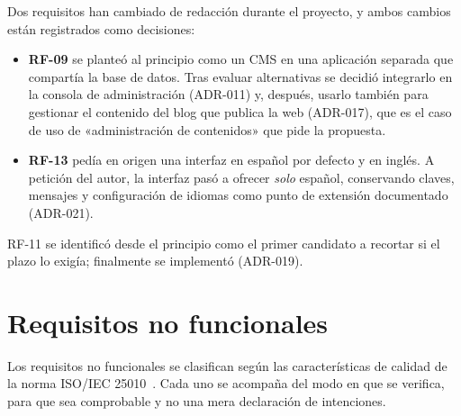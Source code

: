 Dos requisitos han cambiado de redacción durante el proyecto, y ambos cambios
están registrados como decisiones:

\begin{itemize}
  \item \textbf{RF-09} se planteó al principio como un CMS en una aplicación
        separada que compartía la base de datos. Tras evaluar alternativas se
        decidió integrarlo en la consola de administración (ADR-011) y,
        después, usarlo también para gestionar el contenido del blog que
        publica la web (ADR-017), que es el caso de uso de «administración de
        contenidos» que pide la propuesta.
  \item \textbf{RF-13} pedía en origen una interfaz en español por defecto y
        en inglés. A petición del autor, la interfaz pasó a ofrecer
        \emph{solo} español, conservando claves, mensajes y configuración de
        idiomas como punto de extensión documentado (ADR-021).
\end{itemize}

RF-11 se identificó desde el principio como el primer candidato a recortar si
el plazo lo exigía; finalmente se implementó (ADR-019).

\section{Requisitos no funcionales}
\label{sec:req-rnf}

Los requisitos no funcionales se clasifican según las características de
calidad de la norma ISO/IEC 25010~\cite{iso25010}. Cada uno se acompaña del
modo en que se verifica, para que sea comprobable y no una mera declaración
de intenciones.

